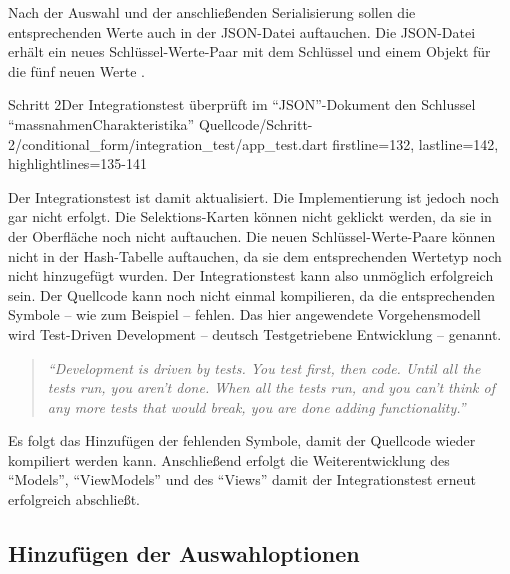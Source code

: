 Nach der Auswahl und der anschließenden Serialisierung sollen die entsprechenden Werte auch in der JSON-Datei auftauchen.
Die JSON-Datei erhält ein neues Schlüssel-Werte-Paar mit dem Schlüssel  und einem Objekt für die fünf neuen Werte .

\begin{alexlisting}{Schritt 2}{Der Integrationstest überprüft im \enquote{JSON}-Dokument den Schlussel \enquote{massnahmenCharakteristika}}
  {Quellcode/Schritt-2/conditional_form/integration_test/app_test.dart}
  {firstline=132, lastline=142, highlightlines={135-141}}
  \label{lst:Schritt2ExpectedJson}
\end{alexlisting}

Der Integrationstest ist damit aktualisiert.
Die Implementierung ist jedoch noch gar nicht erfolgt.
Die Selektions-Karten können nicht geklickt werden, da sie in der Oberfläche noch nicht auftauchen.
Die neuen Schlüssel-Werte-Paare können nicht in der Hash-Tabelle auftauchen, da sie dem entsprechenden Wertetyp noch nicht hinzugefügt wurden.
Der Integrationstest kann also unmöglich erfolgreich sein.
Der Quellcode kann noch nicht einmal kompilieren, da die entsprechenden Symbole -- wie zum Beispiel  -- fehlen.
Das hier angewendete Vorgehensmodell wird Test-Driven Development -- deutsch Testgetriebene Entwicklung -- genannt.
 


\begin{quotation}
\textit{\enquote{Development is driven by tests.
You test first, then code.
Until all the tests run, you aren't
done.
When all the tests run, and you can't think of any more tests that would break, you
are done adding functionality.}}


\end{quotation}

Es folgt das Hinzufügen der fehlenden Symbole, damit der Quellcode wieder kompiliert werden kann.
Anschließend erfolgt die Weiterentwicklung des \enquote{Models}, \enquote{ViewModels} und des \enquote{Views} damit der Integrationstest erneut erfolgreich abschließt.


\subsection{Hinzufügen der Auswahloptionen}

